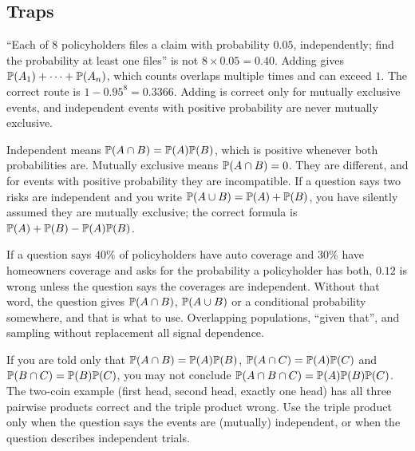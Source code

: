 \subsection{Traps}

\begin{trap}
``Each of $8$ policyholders files a claim with probability $0.05$, independently; find the probability at least one files'' is not $8 \times 0.05 = 0.40$. Adding gives $\mathbb{P}(A_1) + \cdots + \mathbb{P}(A_n)$, which counts overlaps multiple times and can exceed $1$. The correct route is $1 - 0.95^8 = 0.3366$. Adding is correct only for mutually exclusive events, and independent events with positive probability are never mutually exclusive.
\end{trap}

\begin{trap}
Independent means $\mathbb{P}(A \cap B) = \mathbb{P}(A)\mathbb{P}(B)$, which is positive whenever both probabilities are. Mutually exclusive means $\mathbb{P}(A \cap B) = 0$. They are different, and for events with positive probability they are incompatible. If a question says two risks are independent and you write $\mathbb{P}(A \cup B) = \mathbb{P}(A) + \mathbb{P}(B)$, you have silently assumed they are mutually exclusive; the correct formula is $\mathbb{P}(A) + \mathbb{P}(B) - \mathbb{P}(A)\mathbb{P}(B)$.
\end{trap}

\begin{trap}
If a question says $40\%$ of policyholders have auto coverage and $30\%$ have homeowners coverage and asks for the probability a policyholder has both, $0.12$ is wrong unless the question says the coverages are independent. Without that word, the question gives $\mathbb{P}(A \cap B)$, $\mathbb{P}(A \cup B)$ or a conditional probability somewhere, and that is what to use. Overlapping populations, ``given that'', and sampling without replacement all signal dependence.
\end{trap}

\begin{trap}
If you are told only that $\mathbb{P}(A \cap B) = \mathbb{P}(A)\mathbb{P}(B)$, $\mathbb{P}(A \cap C) = \mathbb{P}(A)\mathbb{P}(C)$ and $\mathbb{P}(B \cap C) = \mathbb{P}(B)\mathbb{P}(C)$, you may not conclude $\mathbb{P}(A \cap B \cap C) = \mathbb{P}(A)\mathbb{P}(B)\mathbb{P}(C)$. The two-coin example (first head, second head, exactly one head) has all three pairwise products correct and the triple product wrong. Use the triple product only when the question says the events are (mutually) independent, or when the question describes independent trials.
\end{trap}

